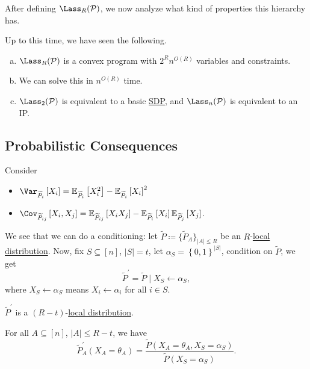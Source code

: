 After defining \(\Lass_R(\mathcal{P} )\), we now analyze what kind of properties this hierarchy has.

\begin{remark}
	Up to this time, we have seen the following.
	\begin{enumerate}[(a)]
		\item \(\Lass_R(\mathcal{P})\) is a convex program with \(2^R n^{O(R)}\) variables and constraints.
		\item We can solve this in \(n^{O(R)}\) time.
		\item \(\Lass_2(\mathcal{P})\) is equivalent to a basic \hyperref[def:SDP]{SDP}, and \(\Lass_n(\mathcal{P})\) is equivalent to an IP.
	\end{enumerate}
\end{remark}


\subsection{Probabilistic Consequences}
Consider
\begin{itemize}
	\item \(\Var_{\widetilde{P} _i}\left[ X_i \right] = \mathbb{E}_{\widetilde{P} _i}\left[ X_i ^{2} \right] - \mathbb{E}_{\widetilde{P} _i}\left[ X_i \right]^{2}  \)
	\item \(\Cov_{\widetilde{P} _{ij}}\left[ X_i, X_j\right] = \mathbb{E}_{\widetilde{P} _{ij}}\left[ X_i X_j\right] - \mathbb{E}_{\widetilde{P} _{i}}\left[ X_i \right] \mathbb{E}_{\widetilde{P} _{j}}\left[ X_j\right]  \).
\end{itemize}
We see that we can do a conditioning: let \(\widetilde{P} \coloneqq \{ \widetilde{P} _{A} \} _{\left\vert A \right\vert \leq R}\) be an \(R\)-\hyperref[def:local-distribution]{local distribution}. Now, fix \(S \subseteq [n]\), \(\left\vert S \right\vert = t\), let \(\alpha _S = \left\{ 0, 1 \right\} ^{\left\vert S \right\vert }\), condition on \(\widetilde{P} \), we get
\[
	\widetilde{P} ^\prime = \widetilde{P} \mid X_S \gets \alpha _S,
\]
where \(X_S\gets \alpha _S\) means \(X_i \gets \alpha _i\) for all \(i\in S\).
\begin{remark}
	\(\widetilde{P} ^\prime \) is a \((R-t)\)-\hyperref[def:local-distribution]{local distribution}.
\end{remark}
\begin{explanation}
	For all \(A \subseteq [n]\), \(\left\vert A \right\vert \leq R-t\), we have
	\[
		\widetilde{P} ^\prime _A (X_A = \theta _A) = \frac{\widetilde{P} (X_A = \theta _A, X_S = \alpha _S)}{\widetilde{P} (X_S = \alpha _S)}.
	\]
\end{explanation}

